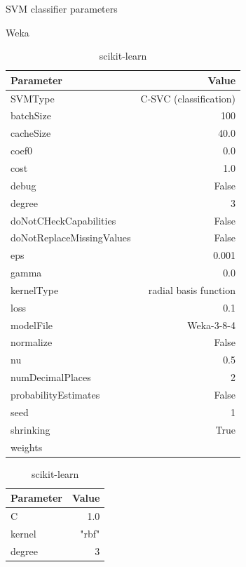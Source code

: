\begin{table}[H]
    \footnotesize
    \centering
    \caption{SVM classifier parameters} \label{tab:svm_param}
    \begin{subtable}[t]{.5\linewidth}
        \caption{Weka \cite{noauthor_libsvm_nodate}}
        \centering
        \begin{tabular}{lr}\toprule
            Parameter & Value \\\midrule
            SVMType & C-SVC (classification) \\
            batchSize & 100 \\
            cacheSize & 40.0 \\
            coef0 & 0.0 \\
            cost & 1.0 \\
            debug & False \\
            degree & 3 \\
            doNotCHeckCapabilities & False \\
            doNotReplaceMissingValues & False \\
            eps & 0.001 \\
            gamma & 0.0 \\
            kernelType & radial basis function\\
            loss & 0.1 \\
            modelFile & Weka-3-8-4 \\
            normalize & False \\
            nu & 0.5 \\
            numDecimalPlaces & 2 \\
            probabilityEstimates & False \\
            seed & 1 \\
            shrinking & True \\
            weights & \\\bottomrule
        \end{tabular}
    \end{subtable}%
    \begin{subtable}[t]{.5\linewidth}
        \caption{scikit-learn \cite{noauthor_sklearnsvmsvc_nodate}}
        \centering
        \begin{tabular}{lr}\toprule
            Parameter & Value \\\midrule
            C & 1.0 \\
            kernel & "rbf" \\
            degree & 3 \\

\end{tabular}
\end{subtable}
\end{table}
